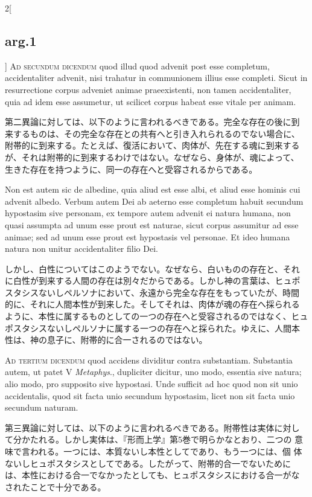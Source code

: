 \documentclass[paper=a4paper,fontsize=10pt,jafontsize=9pt,titlepage]{jlreq}
\begin{document}
\begin{paracol}{2}[\subsection{arg.1}]
{\scshape Ad secundum dicendum} quod illud quod advenit post esse
completum, accidentaliter advenit, nisi trahatur in communionem illius
esse completi. Sicut in resurrectione corpus adveniet animae
praeexistenti, non tamen accidentaliter, quia ad idem esse assumetur,
ut scilicet corpus habeat esse vitale per animam.

\switchcolumn

第二異論に対しては、以下のように言われるべきである。完全な存在の後に到
来するものは、その完全な存在との共有へと引き入れられるのでない場合に、
附帯的に到来する。たとえば、復活において、肉体が、先在する魂に到来する
が、それは附帯的に到来するわけではない。なぜなら、身体が、魂によって、
生きた存在を持つように、同一の存在へと受容されるからである。

\switchcolumn*

Non est autem sic de albedine, quia aliud est esse albi, et aliud esse
hominis cui advenit albedo. Verbum autem Dei ab aeterno esse completum
habuit secundum hypostasim sive personam, ex tempore autem advenit ei
natura humana, non quasi assumpta ad unum esse prout est naturae,
sicut corpus assumitur ad esse animae; sed ad unum esse prout est
hypostasis vel personae. Et ideo humana natura non unitur
accidentaliter filio Dei.

\switchcolumn

しかし、白性についてはこのようでない。なぜなら、白いものの存在と、それ
に白性が到来する人間の存在は別々だからである。しかし神の言葉は、ヒュポ
スタシスないしペルソナにおいて、永遠から完全な存在をもっていたが、時間
的に、それに人間本性が到来した。そしてそれは、肉体が魂の存在へ採られる
ように、本性に属するものとしての一つの存在へと受容されるのではなく、ヒュ
ポスタシスないしペルソナに属する一つの存在へと採られた。ゆえに、人間本
性は、神の息子に、附帯的に合一されるのではない。

\switchcolumn*[\subsection{ad.3}]

{\scshape Ad tertium dicendum} quod accidens dividitur contra
substantiam. Substantia autem, ut patet V {\itshape Metaphys}.,
dupliciter dicitur, uno modo, essentia sive natura; alio modo, pro
supposito sive hypostasi. Unde sufficit ad hoc quod non sit unio
accidentalis, quod sit facta unio secundum hypostasim, licet non sit
facta unio secundum naturam.

\switchcolumn

第三異論に対しては、以下のように言われるべきである。附帯性は実体に対し
て分かたれる。しかし実体は、『形而上学』第5巻で明らかなとおり、二つの
意味で言われる。一つには、本質ないし本性としてであり、もう一つには、個
体ないしヒュポスタシスとしてである。したがって、附帯的合一でないために
は、本性における合一でなかったとしても、ヒュポスタシスにおける合一がな
されたことで十分である。


\end{paracol}
\end{document}
